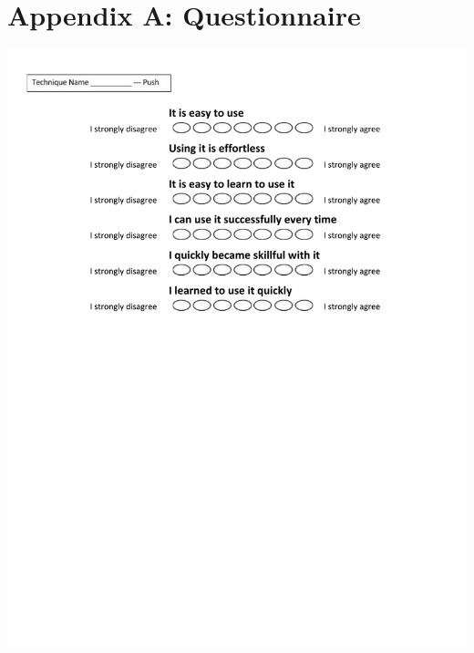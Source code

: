 \section*{Appendix A: Questionnaire}
\begin{adjustbox}{width=1\textwidth}
	\includegraphics{images/questionnaire.pdf}
\end{adjustbox}

